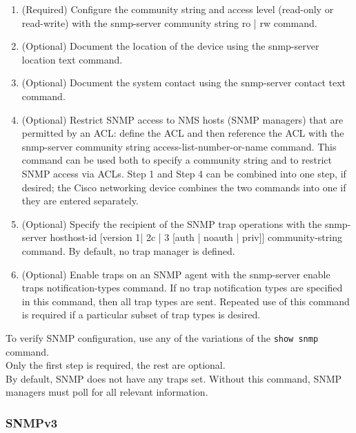 \begin{enumerate}
\item (Required) Configure the community string and access level (read-only or read-write) with the snmp-server community string ro | rw command.

\item (Optional) Document the location of the device using the snmp-server location text command.

\item (Optional) Document the system contact using the snmp-server contact text command.

\item (Optional) Restrict SNMP access to NMS hosts (SNMP managers) that are permitted by an ACL: define the ACL and then reference the ACL with the snmp-server community string access-list-number-or-name command. This command can be used both to specify a community string and to restrict SNMP access via ACLs. Step 1 and Step 4 can be combined into one step, if desired; the Cisco networking device combines the two commands into one if they are entered separately.

\item (Optional) Specify the recipient of the SNMP trap operations with the snmp-server hosthost-id [version {1| 2c | 3 [auth | noauth | priv]}] community-string command. By default, no trap manager is defined.

\item (Optional) Enable traps on an SNMP agent with the snmp-server enable traps notification-types command. If no trap notification types are specified in this command, then all trap types are sent. Repeated use of this command is required if a particular subset of trap types is desired.
\end{enumerate}

\note To verify SNMP configuration, use any of the variations of the \texttt{show snmp} command.\\ \note Only the first step is required, the rest are optional.\\
\note By default, SNMP does not have any traps set. Without this command, SNMP managers must poll for all relevant information. 

\subsubsection{SNMPv3}

